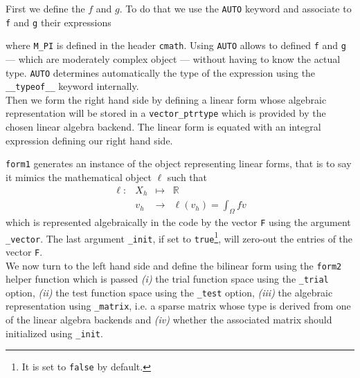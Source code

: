 First we define the $f$ and $g$. To do that we use the
\lstinline!AUTO! keyword and associate to \lstinline!f! and
\lstinline!g! their expressions



\noindent where \lstinline!M_PI! is defined in the header
\lstinline!cmath!.  Using \lstinline!AUTO! allows to defined
\lstinline!f!  and \lstinline!g! --- which are moderately complex
object --- without having to know the actual type. \lstinline!AUTO!
determines automatically the type of the expression using the
\lstinline!__typeof__! keyword internally.\\

\noindent Then we form the right hand side by defining a linear form whose
algebraic representation will be stored in a
\lstinline!vector_ptrtype! which is provided by the chosen linear
algebra backend. The linear form is equated with an integral
expression defining our right hand side.



\noindent \lstinline!form1! generates an instance of the object
representing linear forms, that is to say it mimics the mathematical
object $\ell$ such that
\begin{equation}
  \label{eq:9}
  \begin{array}{rccl}
    \ell: & X_h & \mapsto & \mathbb{R}\\
    & v_h & \rightarrow & \displaystyle{\ell(v_h)=\int_\Omega f v}
  \end{array}
\end{equation}
which is represented algebraically in the code by the vector
\lstinline!F! using the argument \lstinline!_vector!. The last
argument \lstinline!_init!, if set to \lstinline!true!\footnote{It is
  set to \lstinline!false! by default.}, will zero-out the entries of
the vector \lstinline!F!. \\


\noindent We now turn to the left hand side and define the bilinear form using
the \lstinline!form2! helper function which is passed \textit{(i)} the
trial function space using the \lstinline!_trial! option,
\textit{(ii)} the test function space using the \lstinline!_test!
option, \textit{(iii)} the algebraic representation using
\lstinline!_matrix!, i.e. a sparse matrix whose type is derived from
one of the linear algebra backends and \textit{(iv)} whether the
associated matrix should initialized using
\lstinline!_init!.


